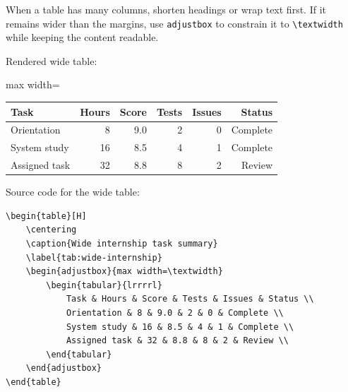 {

When a table has many columns, shorten headings or wrap text first. If
it remains wider than the margins, use \verb|adjustbox| to constrain it
to \verb|\textwidth| while keeping the content readable.

\RegExample Rendered wide table:

\begin{center}
\begin{adjustbox}{max width=\textwidth}
\begin{tabular}{|l|r|r|r|r|r|}
    \hline
    Task & Hours & Score & Tests & Issues & Status \\
    \hline
    Orientation & 8 & 9.0 & 2 & 0 & Complete \\
    System study & 16 & 8.5 & 4 & 1 & Complete \\
    Assigned task & 32 & 8.8 & 8 & 2 & Review \\
    \hline
\end{tabular}
\end{adjustbox}
\end{center}

Source code for the wide table:

\begin{verbatim}
\begin{table}[H]
    \centering
    \caption{Wide internship task summary}
    \label{tab:wide-internship}
    \begin{adjustbox}{max width=\textwidth}
        \begin{tabular}{lrrrrl}
            Task & Hours & Score & Tests & Issues & Status \\
            Orientation & 8 & 9.0 & 2 & 0 & Complete \\
            System study & 16 & 8.5 & 4 & 1 & Complete \\
            Assigned task & 32 & 8.8 & 8 & 2 & Review \\
        \end{tabular}
    \end{adjustbox}
\end{table}
\end{verbatim}


\vspace{0.3cm}


\noindent
{}

}
